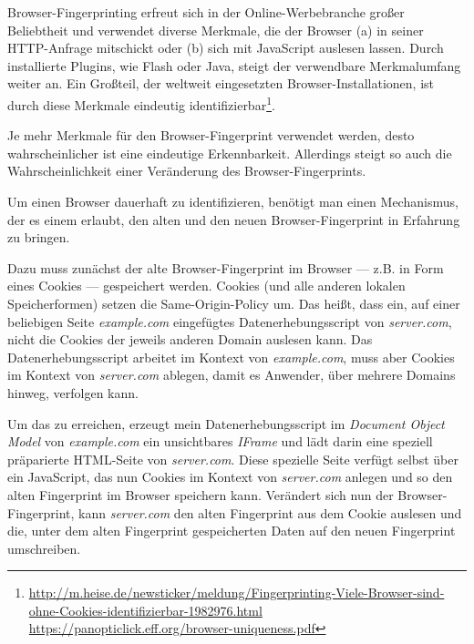 \begin{furtherreading}[frametitle={Stabiles Browser-Fingerprinting}]
\label{subsec:browser-fingerprint}
Browser-Fingerprinting erfreut sich in der Online-Werbebranche großer Beliebtheit \citep{Bager:IDwRnNoQ} und verwendet diverse Merkmale, die der Browser (a) in seiner HTTP-Anfrage mitschickt oder (b) sich mit JavaScript auslesen lassen. Durch installierte Plugins, wie Flash oder Java, steigt der verwendbare Merkmalumfang weiter an. Ein Großteil, der weltweit eingesetzten Browser-Installationen, ist durch diese Merkmale eindeutig identifizierbar\footnote{\url{http://m.heise.de/newsticker/meldung/Fingerprinting-Viele-Browser-sind-ohne-Cookies-identifizierbar-1982976.html}\\\url{https://panopticlick.eff.org/browser-uniqueness.pdf}}.

Je mehr Merkmale für den Browser-Fingerprint verwendet werden, desto wahrscheinlicher ist eine eindeutige Erkennbarkeit. Allerdings steigt so auch die Wahrscheinlichkeit einer Veränderung des Browser-Fingerprints.

Um einen Browser dauerhaft zu identifizieren, benötigt man einen Mechanismus, der es einem erlaubt, den alten und den neuen Browser-Fingerprint in Erfahrung zu bringen.

Dazu muss zunächst der alte Browser-Fingerprint im Browser --- z.B. in Form eines Cookies --- gespeichert werden. Cookies (und alle anderen lokalen Speicherformen) setzen die Same-Origin-Policy um. Das heißt, dass ein, auf einer beliebigen  Seite \textit{example.com} eingefügtes Datenerhebungsscript von \textit{server.com}, nicht die Cookies der jeweils anderen Domain auslesen kann. Das Datenerhebungsscript arbeitet im Kontext von \textit{example.com}, muss aber Cookies im Kontext von \textit{server.com} ablegen, damit es Anwender, über mehrere Domains hinweg, verfolgen kann.

Um das zu erreichen, erzeugt mein Datenerhebungsscript im \textit{Document Object Model} von \textit{example.com} ein unsichtbares \textit{IFrame} und lädt darin eine speziell präparierte HTML-Seite von \textit{server.com}. Diese spezielle Seite verfügt selbst über ein JavaScript, das nun Cookies im Kontext von \textit{server.com} anlegen und so den alten Fingerprint im Browser speichern kann. Verändert sich nun der Browser-Fingerprint, kann \textit{server.com} den alten Fingerprint aus dem Cookie auslesen und die, unter dem alten Fingerprint gespeicherten Daten auf den neuen Fingerprint umschreiben.


\end{furtherreading}
